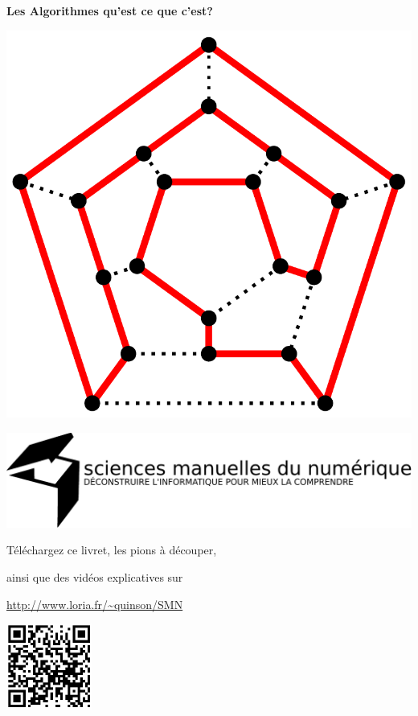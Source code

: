 \documentclass[a7paper,pagesize,DIV=14,10pt]{scrbook}
\begin{document}
%  
\begin{center}
  \textbf{{\huge Les Algorithmes} \Large qu'est ce que c'est? }
  
  \includegraphics[width=.5\linewidth]{img/Hamiltonian_path.pdf}

\medskip
\centerline{\includegraphics[width=.9\linewidth]{img/logo_SMN.pdf}}

\medskip
\begin{spacing}{.8}
  \centerline{\footnotesize Téléchargez ce livret, les pions à découper,}
  \centerline{\footnotesize ainsi que des vidéos explicatives sur}

  \centerline{\small\color{blue}\url{http://www.loria.fr/~quinson/SMN}}
\end{spacing}

\includegraphics[width=.25\linewidth]{img/QRcode.pdf} 
\end{center}
\end{document}
